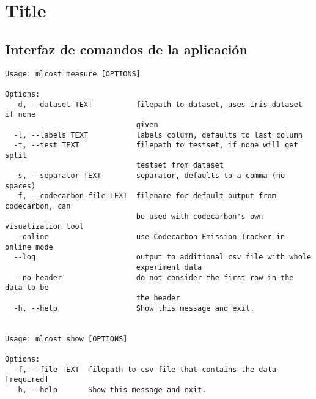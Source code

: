 \chapter{Title}

\section{Interfaz de comandos de la aplicación}
\label{app:cli}

\begin{verbatim}
Usage: mlcost measure [OPTIONS]

Options:
  -d, --dataset TEXT          filepath to dataset, uses Iris dataset if none
                              given
  -l, --labels TEXT           labels column, defaults to last column
  -t, --test TEXT             filepath to testset, if none will get split
                              testset from dataset
  -s, --separator TEXT        separator, defaults to a comma (no spaces)
  -f, --codecarbon-file TEXT  filename for default output from codecarbon, can
                              be used with codecarbon's own visualization tool
  --online                    use Codecarbon Emission Tracker in online mode
  --log                       output to additional csv file with whole
                              experiment data
  --no-header                 do not consider the first row in the data to be
                              the header
  -h, --help                  Show this message and exit.


Usage: mlcost show [OPTIONS]

Options:
  -f, --file TEXT  filepath to csv file that contains the data  [required]
  -h, --help       Show this message and exit.
\end{verbatim}